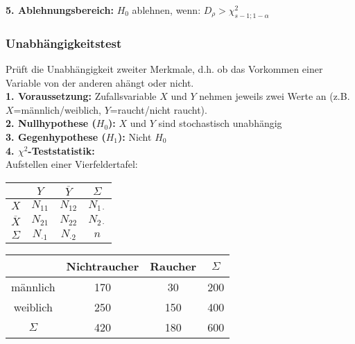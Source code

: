 \textbf{5. Ablehnungsbereich:} \(H_0\) ablehnen, wenn:  \(D_{\rho} > \chi^2_{s-1;1-\alpha}\)\\


\subsubsection{Unabhängigkeitstest}

Prüft die Unabhängigkeit zweiter Merkmale, d.h. ob das Vorkommen einer Variable von der anderen ahängt oder nicht.\\


\textbf{1. Voraussetzung:} Zufallsvariable \(X\) und \(Y\) nehmen jeweils zwei Werte an (z.B. \(X\)=männlich/weiblich, \(Y\)=raucht/nicht raucht).\\

\textbf{2. Nullhypothese (\(H_0\)):} \(X\) und \(Y\) sind stochastisch unabhängig\\

\textbf{3. Gegenhypothese (\(H_1\)):} Nicht \(H_0\)\\

\textbf{4. \(\chi^2\)-Teststatistik:}\\

Aufstellen einer Vierfeldertafel:\\

\begin{minipage}[c]{.4\textwidth}
    \centering
    \begin{tabular}{c|c|c|c}
                   & $Y$           & $\overline{Y}$ & $\Sigma$         \\ 
                   \hline
    $X$            & \(N_{11}\)    & \(N_{12}\)     & \(N_{1 \cdot} \) \\ 
    \hline
    $\overline{X}$ & \(N_{21}\)    & \(N_{22}\)     & \(N_{2\cdot} \)  \\ 
    \hline
    $\Sigma$       & $N_{\cdot 1}$ & $N_{\cdot 2}$  & $n$
    \end{tabular}
\end{minipage}
\begin{minipage}[c]{.6\textwidth}
    \centering
    \begin{tabular}{c|c|c|c}
             & Nichtraucher & Raucher & $\Sigma$ \\ 
    \hline
    männlich & 170          & 30      & 200 \\
    \hline
    weiblich & 250          & 150     & 400  \\
    \hline
    $\Sigma$ & 420          & 180     & 600
    \end{tabular}
\end{minipage}\\\\

